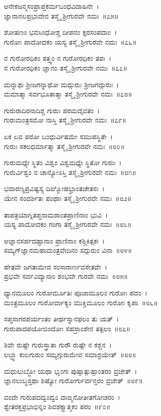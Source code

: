 ಅನೇಕಜನ್ಮಸಂಪ್ರಾಪ್ತಕರ್ಮಬಂಧವಿದಾಹಿನೇ~।\\
ಜ್ಞಾನಾನಲಪ್ರಭಾವೇನ ತಸ್ಮೈ ಶ್ರೀಗುರವೇ ನಮಃ~॥೭೫॥

ಶೋಷಣಂ ಭವಸಿಂಧೋಶ್ಚ ದೀಪನಂ ಕ್ಷರಸಂಪದಾಂ~।\\
ಗುರೋಃ ಪಾದೋದಕಂ ಯಸ್ಯ ತಸ್ಮೈ ಶ್ರೀಗುರವೇ ನಮಃ~॥೭೬॥

ನ ಗುರೋರಧಿಕಂ ತತ್ತ್ವಂ ನ ಗುರೋರಧಿಕಂ ತಪಃ~।\\
ನ ಗುರೋರಧಿಕಂ ಜ್ಞಾನಂ ತಸ್ಮೈ ಶ್ರೀಗುರವೇ ನಮಃ~॥೭೭॥

ಮನ್ನಾಥಃ ಶ್ರೀಜಗನ್ನಾಥೋ ಮದ್ಗುರುಃ ಶ್ರೀಜಗದ್ಗುರುಃ~।\\
ಮಮಾತ್ಮಾ ಸರ್ವಭೂತಾತ್ಮಾ ತಸ್ಮೈ ಶ್ರೀಗುರವೇ ನಮಃ~॥೭೮॥

ಗುರುರಾದಿರನಾದಿಶ್ಚ ಗುರುಃ ಪರಮದೈವತಂ~।\\
ಗುರುಮಂತ್ರಸಮೋ ನಾಸ್ತಿ ತಸ್ಮೈ ಶ್ರೀಗುರವೇ ನಮಃ~॥೭೯॥

ಏಕ ಏವ ಪರೋ ಬಂಧುರ್ವಿಷಮೇ ಸಮುಪಸ್ಥಿತೇ~।\\
ಗುರುಃ ಸಕಲಧರ್ಮಾತ್ಮಾ ತಸ್ಮೈ ಶ್ರೀಗುರವೇ ನಮಃ~॥೮೦॥

ಗುರುಮಧ್ಯೇ ಸ್ಥಿತಂ ವಿಶ್ವಂ ವಿಶ್ವಮಧ್ಯೇ ಸ್ಥಿತೋ ಗುರುಃ~।\\
ಗುರುರ್ವಿಶ್ವಂ ನ ಚಾನ್ಯೋಽಸ್ತಿ ತಸ್ಮೈ ಶ್ರೀಗುರವೇ ನಮಃ~॥೮೧॥

ಭವಾರಣ್ಯಪ್ರವಿಷ್ಟಸ್ಯ ದಿಙ್ಮೋಹಭ್ರಾಂತಚೇತಸಃ~।\\
ಯೇನ ಸಂದರ್ಶಿತಃ ಪಂಥಾಃ ತಸ್ಮೈ ಶ್ರೀಗುರವೇ ನಮಃ~॥೮೨॥

ತಾಪತ್ರಯಾಗ್ನಿತಪ್ತನಾಮಶಾಂತಪ್ರಾಣಿನಾಂ ಭುವಿ~।\\
ಯಸ್ಯ ಪಾದೋದಕಂ ಗಂಗಾ ತಸ್ಮೈ ಶ್ರೀಗುರವೇ ನಮಃ~॥೮೩॥

ಅಜ್ಞಾನಸರ್ಪದಷ್ಟಾನಾಂ ಪ್ರಾಣಿನಾಂ ಕಶ್ಚಿಕಿತ್ಸಕಃ~।\\
ಸಮ್ಯಗ್‌ಜ್ಞಾನಮಹಾಮಂತ್ರವೇದಿನಂ ಸದ್ಗುರುಂ ವಿನಾ~॥೮೪॥

ಹೇತವೇ ಜಗತಾಮೇವ ಸಂಸಾರಾರ್ಣವಸೇತವೇ~।\\
ಪ್ರಭವೇ ಸರ್ವವಿದ್ಯಾನಾಂ ಶಂಭವೇ ಗುರವೇ ನಮಃ~॥೮೫॥

ಧ್ಯಾನಮೂಲಂ ಗುರೋರ್ಮೂತಿಃ ಪೂಜಾಮೂಲಂ ಗುರೋಃ ಪದಂ~।\\
ಮಂತ್ರಮೂಲಂ ಗುರೋರ್ವಾಕ್ಯಂ ಮುಕ್ತಿಮೂಲಂ ಗುರೋಃ ಕೃಪಾ~॥೮೬॥

ಸಪ್ತಸಾಗರಪರ್ಯಂತಂ ತೀರ್ಥಸ್ನಾನಫಲಂ ತು ಯತ್~।\\
ಗುರುಪಾದಪಯೋಬಿಂದೋಃ ಸಹಸ್ರಾಂಶೇನ ತತ್ಫಲಂ~॥೮೭॥

ಶಿವೇ ರುಷ್ಟೇ ಗುರುಸ್ತ್ರಾತಾ ಗುರೌ ರುಷ್ಟೇ ನ ಕಶ್ಚನ~।\\
ಲಬ್ಧ್ವಾ ಕುಲಗುರುಂ ಸಮ್ಯಗ್ಗುರುಮೇವ ಸಮಾಶ್ರಯೇತ್~॥೮೮॥

ಮಧುಲುಬ್ಧೋ ಯಥಾ ಭೃಂಗಃ ಪುಷ್ಪಾತ್ಪುಷ್ಪಾಂತರಂ ವ್ರಜೇತ್~।\\
ಜ್ಞಾನಲುಬ್ಧಸ್ತಥಾ ಶಿಷ್ಯೋ ಗುರೋರ್ಗುರ್ವನ್ತರಂ ವ್ರಜೇತ್~॥೮೯॥

ವಂದೇ ಗುರುಪದದ್ವಂದ್ವಂ ವಾಙ್ಮನೋತೀತಗೋಚರಂ~।\\
ಶ್ವೇತರಕ್ತಪ್ರಭಾಭಿನ್ನಂ ಶಿವಶಕ್ತ್ಯಾತ್ಮಕಂ ಪರಂ~॥೯೦॥

